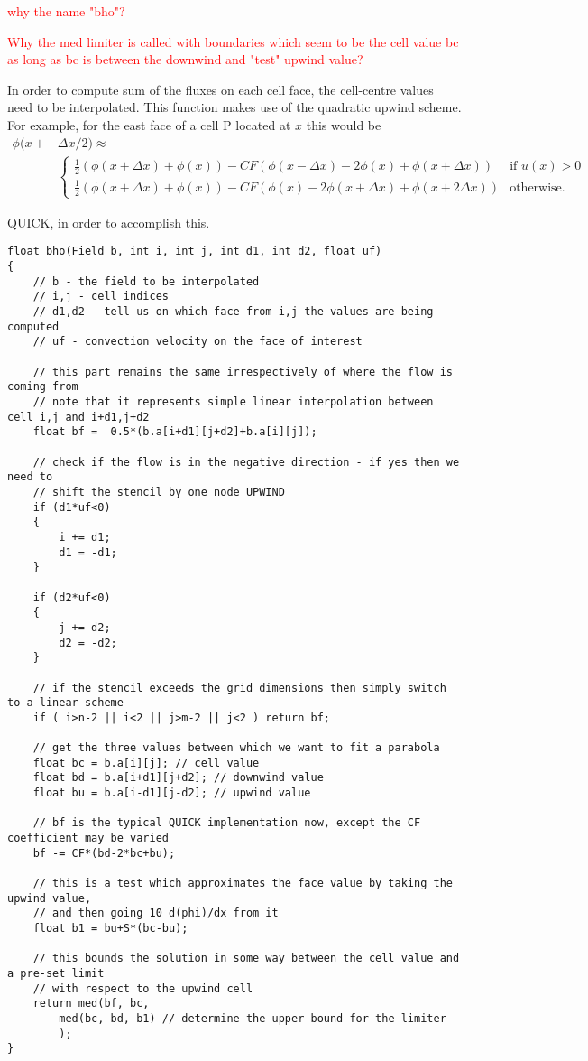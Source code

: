 \documentclass[notitlepage]{article}
\begin{document}
\textcolor{red}{why the name "bho"?}

\textcolor{red}{Why the med limiter is called with boundaries which seem to be
	the cell value bc as long as bc is between the downwind and "test" upwind value?}

In order to compute sum of the fluxes on each cell face, the cell-centre values
need to be interpolated. This function makes use of the quadratic upwind scheme.
For example, for the east face of a cell P located at $x$ this would be
%
\begin{equation}
\begin{aligned}
\phi(x+&\Delta x/2) \approx \\
&\begin{cases}
	\frac{1}{2}(\phi(x + \Delta x) + \phi(x)) - CF (\phi(x- \Delta x) -2 \phi(x) + \phi(x+\Delta x)) & \mbox{if } u(x)>0 \\
	\frac{1}{2}(\phi(x + \Delta x) + \phi(x)) - CF (\phi(x) -2 \phi(x+\Delta x) + \phi(x+2\Delta x)) & \mbox{otherwise.}
\end{cases} 
\end{aligned}
\end{equation}

QUICK, in order to accomplish this. 

\begin{lstlisting}[style=myCpp]
float bho(Field b, int i, int j, int d1, int d2, float uf)
{
	// b - the field to be interpolated
	// i,j - cell indices
	// d1,d2 - tell us on which face from i,j the values are being computed
	// uf - convection velocity on the face of interest
	
	// this part remains the same irrespectively of where the flow is coming from
	// note that it represents simple linear interpolation between cell i,j and i+d1,j+d2
	float bf =  0.5*(b.a[i+d1][j+d2]+b.a[i][j]);
	
	// check if the flow is in the negative direction - if yes then we need to
	// shift the stencil by one node UPWIND
	if (d1*uf<0)
	{
		i += d1; 
		d1 = -d1;
	}
	
	if (d2*uf<0)
	{
		j += d2;
		d2 = -d2;
	}
	
	// if the stencil exceeds the grid dimensions then simply switch to a linear scheme
	if ( i>n-2 || i<2 || j>m-2 || j<2 ) return bf;
	
	// get the three values between which we want to fit a parabola
	float bc = b.a[i][j]; // cell value
	float bd = b.a[i+d1][j+d2]; // downwind value
	float bu = b.a[i-d1][j-d2]; // upwind value
	
	// bf is the typical QUICK implementation now, except the CF coefficient may be varied
	bf -= CF*(bd-2*bc+bu);
	
	// this is a test which approximates the face value by taking the upwind value,
	// and then going 10 d(phi)/dx from it
	float b1 = bu+S*(bc-bu);
	
	// this bounds the solution in some way between the cell value and a pre-set limit
	// with respect to the upwind cell
	return med(bf, bc,
		med(bc, bd, b1) // determine the upper bound for the limiter
		);
}
\end{lstlisting}
\end{document}
